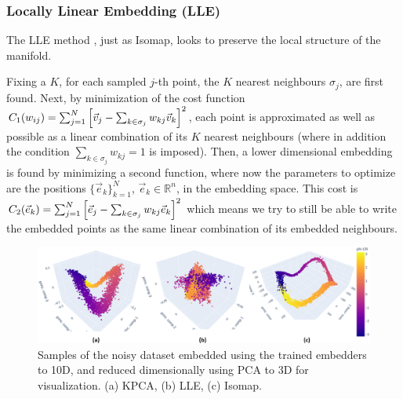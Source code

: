 \documentclass[11pt, a4paper, twoside]{article} %
\newcommand{\R}{\mathbb{R}} %
\DeclareRobustCommand{\mybox}[2][gray!10]{%
\begin{tcolorbox}[   %
        left=0.2cm,
        right=0.2cm,
        top=0.15cm,
        bottom=0.15cm,
        colback=#1,
        colframe=#1,
        width=\dimexpr\textwidth\relax, 
        enlarge left by=0mm,
        boxsep=5pt,
        arc=0pt,outer arc=0pt,
        ]
        #2
\end{tcolorbox}
}
\begin{document}
\subsubsection*{Locally Linear Embedding (LLE)}\vspace{-0.2cm}
The LLE method \cite{LLE}, just as Isomap, looks to preserve the local structure of the manifold.

\mybox{ Fixing a $K$, for each sampled $j$-th point, the $K$ nearest neighbours $\sigma_j$, are first found. Next, by minimization of the cost function $C_1(w_{ij})=\sum_{j=1}^N \qty[\vec{v}_j-\sum_{k\in\sigma_j}w_{kj}\vec{v}_k]^2$, each point is approximated as well as possible as a linear combination of its $K$ nearest neighbours (where in addition the condition $\sum_{k\in\sigma_j}w_{kj}=1$ is imposed). Then, a lower dimensional embedding is found by minimizing a second function, where now the parameters to optimize are the positions $\{\vec{e}_k\}_{k=1}^N$, $\vec{e}_k\in\R^n$, in the embedding space. This cost is $C_2(\vec{e}_k)=\sum_{j=1}^N \qty[\vec{e}_j-\sum_{k\in\sigma_j}w_{kj}\vec{e}_k]^2$ which means we try to still be able to write the embedded points as the same linear combination of its embedded neighbours.}
 
\begin{figure}[h!] 
     \centering 
    \includegraphics[width=0.96\linewidth]{emb2.PNG}
    \caption{ Samples of the noisy dataset embedded using the trained embedders to 10D, and reduced dimensionally using PCA to 3D for visualization. (a) KPCA, (b) LLE, (c) Isomap.  }
    \label{fig:embeddings2}
\end{figure}
\end{document}
